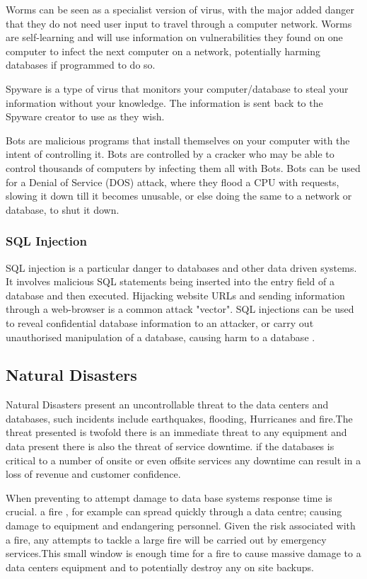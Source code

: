 \documentclass[11pt, twocolumn]{article}
\begin{document}
Worms can be seen as a specialist version of virus, with the major added danger that they do not need user input to travel through a computer network. Worms are self-learning and will use information on vulnerabilities they found on one computer to infect the next computer on a network, potentially harming databases if programmed to do so\cite{Bas}.

Spyware is a type of virus that monitors your computer/database to steal your information without your knowledge.  The information is sent back to the Spyware creator to use as they wish\cite{Bas}.

Bots are malicious programs that install themselves on your computer with the intent of controlling it.  Bots are controlled by a cracker who may be able to control thousands of computers by infecting them all with Bots.  Bots can be used for a Denial of Service (DOS) attack, where they flood a CPU with requests, slowing it down till it becomes unusable, or else doing the same to a network or database, to shut it down\cite{Bas}. 

\subsubsection{SQL Injection}
SQL injection is a particular danger to databases and other data driven systems.  It involves malicious SQL statements being inserted into the entry field of a database and then executed.  Hijacking website URLs and sending information through a web-browser is a common attack "vector".  SQL injections can be used to reveal confidential database information to an attacker, or carry out unauthorised manipulation of a database, causing harm to a database \cite{Bas}.


\subsection{Natural Disasters}
Natural Disasters present an uncontrollable threat to the data centers and databases, such incidents include earthquakes, flooding, Hurricanes and fire.The threat presented is twofold there is an immediate threat to any equipment and data present there is also the threat of service downtime. if the databases is critical to a number of onsite or even offsite services any downtime can result in a loss of revenue and customer confidence.

When preventing to attempt damage to data base systems response time is crucial. a fire , for example  can spread quickly through a data centre; causing damage to equipment and endangering personnel. Given the risk associated with a fire, any attempts to tackle a large fire will be carried out by emergency services.This small window is enough time for a fire to cause massive damage to a data centers equipment and to potentially destroy any on site backups.
\end{document}
